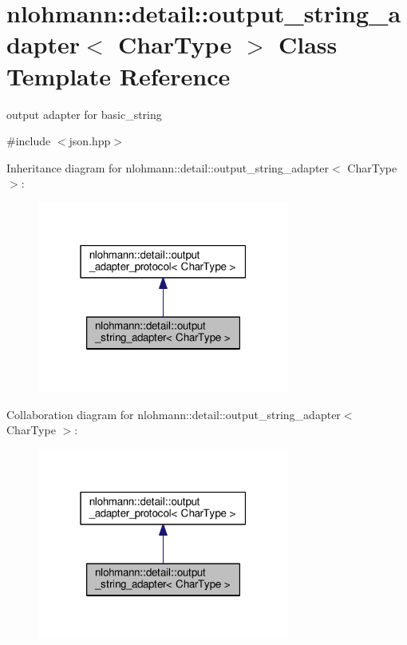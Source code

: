 \hypertarget{classnlohmann_1_1detail_1_1output__string__adapter}{}\section{nlohmann\+:\+:detail\+:\+:output\+\_\+string\+\_\+adapter$<$ Char\+Type $>$ Class Template Reference}
\label{classnlohmann_1_1detail_1_1output__string__adapter}


output adapter for basic\+\_\+string  




{\ttfamily \#include $<$json.\+hpp$>$}



Inheritance diagram for nlohmann\+:\+:detail\+:\+:output\+\_\+string\+\_\+adapter$<$ Char\+Type $>$\+:\nopagebreak
\begin{figure}[H]
\begin{center}
\leavevmode
\includegraphics[width=235pt]{classnlohmann_1_1detail_1_1output__string__adapter__inherit__graph}
\end{center}
\end{figure}


Collaboration diagram for nlohmann\+:\+:detail\+:\+:output\+\_\+string\+\_\+adapter$<$ Char\+Type $>$\+:\nopagebreak
\begin{figure}[H]
\begin{center}
\leavevmode
\includegraphics[width=235pt]{classnlohmann_1_1detail_1_1output__string__adapter__coll__graph}
\end{center}
\end{figure}
